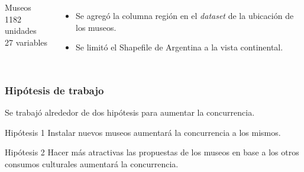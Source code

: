 \documentclass[10pt]{beamer}
\begin{document}
\begin{frame}
  \begin{columns}
      Museos\\
      1182 unidades\\
      27 variables


        \begin{itemize}
          \item Se agregó la columna región en el \emph{dataset} de la ubicación de los museos.
          \item Se limitó el Shapefile de Argentina a la vista continental.
        \end{itemize}
  \end{columns}
\end{frame}


\begin{frame}
  \frametitle{Hipótesis de trabajo}
  Se trabajó alrededor de dos hipótesis para aumentar la concurrencia.

  \begin{block}{Hipótesis 1}
    Instalar nuevos museos aumentará la concurrencia a los mismos.
  \end{block}

  \begin{block}{Hipótesis 2}
    Hacer más atractivas las propuestas de los museos en base a los otros consumos culturales aumentará la concurrencia.
  \end{block}
\end{frame}
\end{document}
